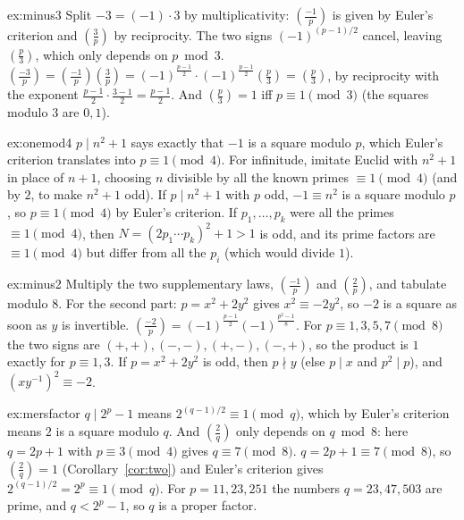 \begin{solution}{ex:minus3}
\idea Split $-3=(-1)\cdot3$ by multiplicativity: $\left(\frac{-1}p\right)$ is given by Euler's criterion and $\left(\frac3p\right)$ by reciprocity. The two signs $(-1)^{(p-1)/2}$ cancel, leaving $\left(\frac p3\right)$, which only depends on $p\bmod3$.
\writeup $\left(\frac{-3}p\right)=\left(\frac{-1}p\right)\left(\frac3p\right)=(-1)^{\frac{p-1}2}\cdot(-1)^{\frac{p-1}2}\left(\frac p3\right)=\left(\frac p3\right)$, by reciprocity with the exponent $\frac{p-1}2\cdot\frac{3-1}2=\frac{p-1}2$. And $\left(\frac p3\right)=1$ iff $p\equiv1\pmod3$ (the squares modulo $3$ are $0,1$).
\end{solution}

\begin{solution}{ex:onemod4}
\idea $p\mid n^2+1$ says exactly that $-1$ is a square modulo $p$, which Euler's criterion translates into $p\equiv1\pmod4$. For infinitude, imitate Euclid with $n^2+1$ in place of $n+1$, choosing $n$ divisible by all the known primes $\equiv1\pmod4$ (and by $2$, to make $n^2+1$ odd).
\writeup If $p\mid n^2+1$ with $p$ odd, $-1\equiv n^2$ is a square modulo $p$, so $p\equiv1\pmod4$ by Euler's criterion. If $p_1,\dots,p_k$ were all the primes $\equiv1\pmod4$, then $N=(2p_1\cdots p_k)^2+1>1$ is odd, and its prime factors are $\equiv1\pmod4$ but differ from all the $p_i$ (which would divide $1$).
\end{solution}

\begin{solution}{ex:minus2}
\idea Multiply the two supplementary laws, $\left(\frac{-1}p\right)$ and $\left(\frac2p\right)$, and tabulate modulo $8$. For the second part: $p=x^2+2y^2$ gives $x^2\equiv-2y^2$, so $-2$ is a square as soon as $y$ is invertible.
\writeup $\left(\frac{-2}p\right)=(-1)^{\frac{p-1}2}(-1)^{\frac{p^2-1}8}$. For $p\equiv1,3,5,7\pmod8$ the two signs are $(+,+),(-,-),(+,-),(-,+)$, so the product is $1$ exactly for $p\equiv1,3$. If $p=x^2+2y^2$ is odd, then $p\nmid y$ (else $p\mid x$ and $p^2\mid p$), and $\left(xy^{-1}\right)^2\equiv-2$.
\end{solution}

\begin{solution}{ex:mersfactor}
\idea $q\mid2^p-1$ means $2^{(q-1)/2}\equiv1\pmod q$, which by Euler's criterion means $2$ is a square modulo $q$. And $\left(\frac2q\right)$ only depends on $q\bmod8$: here $q=2p+1$ with $p\equiv3\pmod4$ gives $q\equiv7\pmod8$.
\writeup $q=2p+1\equiv7\pmod8$, so $\left(\frac2q\right)=1$ (Corollary~\ref{cor:two}) and Euler's criterion gives $2^{(q-1)/2}=2^p\equiv1\pmod q$. For $p=11,23,251$ the numbers $q=23,47,503$ are prime, and $q<2^p-1$, so $q$ is a proper factor.
\end{solution}

